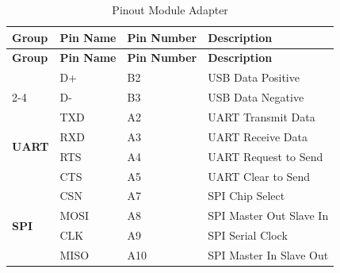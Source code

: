                 \begin{longtable}{|l|l|p{6.5cm}|p{4.5cm}|}
                    \caption{Pinout Module Adapter}
                    \label{tab:new_module_adapter_pinout} \\
                    \hline
                    \textbf{Group} & \textbf{Pin Name} & \textbf{Pin Number} & \textbf{Description} \\ \hline
                    \endfirsthead
                
                    \hline
                    \textbf{Group} & \textbf{Pin Name} & \textbf{Pin Number} & \textbf{Description} \\ \hline
                    \endhead
                
                    \hline
                    \endfoot
                
                    \hline
                    \endlastfoot
                
                    \multirow{2}{*}{\textbf{USB}}
                        & D+   & B2 & USB Data Positive \\ \cline{2-4}
                        & D-   & B3 & USB Data Negative \\ \hline
                
                    \multirow{4}{*}{\textbf{UART}}
                        & TXD  & A2 & UART Transmit Data \\ \cline{2-4}
                        & RXD  & A3 & UART Receive Data \\ \cline{2-4}
                        & RTS  & A4 & UART Request to Send \\ \cline{2-4}
                        & CTS  & A5 & UART Clear to Send \\ \hline
                
                    \multirow{4}{*}{\textbf{SPI}}
                        & CSN  & A7  & SPI Chip Select \\ \cline{2-4}
                        & MOSI & A8  & SPI Master Out Slave In \\ \cline{2-4}
                        & CLK  & A9  & SPI Serial Clock \\ \cline{2-4}
                        & MISO & A10 & SPI Master In Slave Out \\ \hline
                

\end{longtable}
